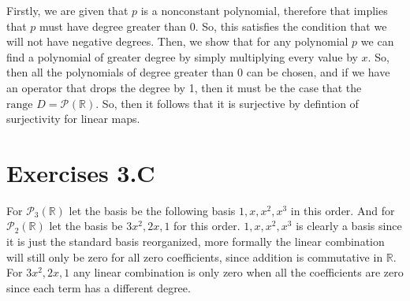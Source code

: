 \documentclass[10pt, twocolumn]{article}
\newcommand{\R}{\mathbb{R}}
\newcommand{\poly}[2]{\mathcal{P}_{#1}\left(#2\right)}
\newcommand{\range}{\text{range }}
\begin{document}
\begin{q}[26]
    Firstly, we are given that $ p $ is a nonconstant polynomial, therefore that implies that $ p $ must have degree greater than 0. 
    So, this satisfies the condition that we will not have negative degrees. 
    Then, we show that for any polynomial $ p $ we can find a polynomial of greater degree by simply multiplying every value by $ x $. 
    So, then all the polynomials of degree greater than 0 can be chosen, and if we have an operator that drops the degree by 1, then it must be the case that 
    the $ \range D = \poly{}{\R} $. So, then it follows that it is surjective by defintion of surjectivity for linear maps.
\end{q}

\section{Exercises 3.C}
\begin{q}[2]
    For $ \poly{3}{\R} $ let the basis be the following basis $ 1, x, x^2, x^3 $ in this order. 
    And for $ \poly{2}{\R} $ let the basis be $ 3x^2, 2x, 1 $ for this order. 
    $ 1, x, x^2, x^3 $ is clearly a basis since it is just the standard basis reorganized, more formally the linear combination will still only be zero for all zero coefficients, since addition is commutative in $ \R $. 
    For  $ 3x^2, 2x, 1 $ any linear combination is only zero when all the coefficients are zero since each term has a different degree. 
\end{q}
\end{document}
